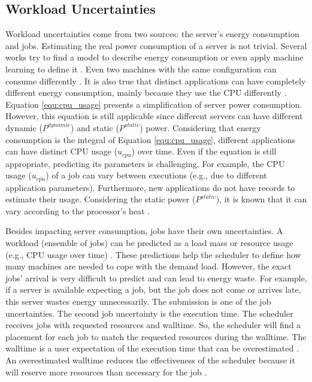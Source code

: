 
\subsection{Workload Uncertainties}
Workload uncertainties come from two sources: the server's energy consumption and jobs. Estimating the real power consumption of a server is not trivial. Several works try to find a model to describe energy consumption or even apply machine learning to define it \cite{dayarathna2015data}. Even two machines with the same configuration can consume differently \cite{orgerie2010demystifying}. It is also true that distinct applications can have completely different energy consumption, mainly because they use the CPU differently \cite{orgerie2010demystifying}. Equation \ref{equ:cpu_usage} presents a simplification of server power consumption. However, this equation is still applicable since different servers can have different dynamic ($P^{dynamic}$) and static ($P^{static}$) power. Considering that energy consumption is the integral of Equation \ref{equ:cpu_usage}, different applications can have distinct CPU usage ($u_{cpu}$) over time. Even if the equation is still appropriate, predicting its parameters is challenging. For example, the CPU usage ($u_{cpu}$) of a job can vary between executions (e.g., due to different application parameters). Furthermore, new applications do not have records to estimate their usage. Considering the static power ($P^{static}$), it is known that it can vary according to the processor's heat \cite{patterson2008effect}.

Besides impacting server consumption, jobs have their own uncertainties. A workload (ensemble of jobs) can be predicted as a load mass or resource usage (e.g., CPU usage over time) \cite{masdari2020survey, vashistha2020literature}. These predictions help the scheduler to define how many machines are needed to cope with the demand load. However, the exact jobs' arrival is very difficult to predict and can lead to energy waste. For example, if a server is available expecting a job, but the job does not come or arrives late, this server wastes energy unnecessarily. The submission is one of the job uncertainties. The second job uncertainty is the execution time. The scheduler receives jobs with requested resources and walltime. So, the scheduler will find a placement for each job to match the requested resources during the walltime. The walltime is a user expectation of the execution time that can be overestimated \cite{takizawa2020effect}. An overestimated walltime reduces the effectiveness of the scheduler because it will reserve more resources than necessary for the job \cite{srinivasan2002characterization, takizawa2020effect}. 

